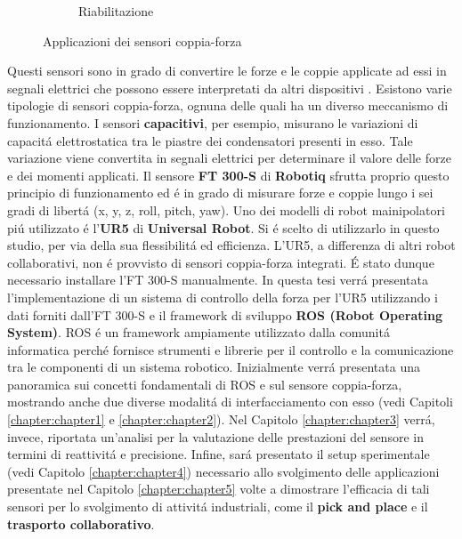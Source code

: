 \begin{figure}[H]
\begin{subfigure}[b]{0.33\textwidth}
        \caption{Riabilitazione}
        \label{fig:rehab}
    \end{subfigure}
    \caption{Applicazioni dei sensori coppia-forza}\label{fig:industrial_applications}
\end{figure}
Questi sensori sono in grado di convertire le forze e le coppie applicate ad essi in segnali elettrici che possono essere 
interpretati da altri dispositivi \cite{templeman2020multi}. 
Esistono varie tipologie di sensori coppia-forza, ognuna delle quali ha un diverso meccanismo di funzionamento. 
I sensori \textbf{capacitivi}, per esempio, misurano le variazioni di capacit\'{a} elettrostatica tra le piastre dei condensatori 
presenti in esso. Tale variazione viene convertita in segnali elettrici per determinare il valore delle forze e dei momenti 
applicati.
Il sensore \textbf{FT 300-S} di \textbf{Robotiq} sfrutta proprio questo principio di funzionamento ed \'{e} in grado di misurare 
forze e coppie lungo i sei gradi di libert\'{a} (x, y, z, roll, pitch, yaw). 
Uno dei modelli di robot mainipolatori pi\'{u} utilizzato \'{e} l'\textbf{UR5} di \textbf{Universal Robot}. Si \'{e} scelto di 
utilizzarlo in questo studio, per via della sua flessibilit\'{a} ed efficienza. 
L'UR5, a differenza di altri robot collaborativi, non \'{e} provvisto di sensori coppia-forza integrati. \'{E} stato dunque necessario 
installare l'FT 300-S manualmente. 
In questa tesi verr\'{a} presentata l'implementazione di un sistema di controllo della forza per l'UR5 utilizzando i dati
forniti dall'FT 300-S e il framework di sviluppo \textbf{ROS (Robot Operating System)}.
ROS \'{e} un framework ampiamente utilizzato dalla comunit\'{a} informatica perch\'{e} fornisce strumenti e librerie 
per il controllo e la comunicazione tra le componenti di un sistema robotico. Inizialmente verr\'{a} presentata una panoramica 
sui concetti fondamentali di ROS e sul sensore coppia-forza, mostrando anche due diverse modalit\'{a} di interfacciamento con esso 
(vedi Capitoli \ref{chapter:chapter1} e \ref{chapter:chapter2}).
Nel Capitolo \ref{chapter:chapter3} verr\'{a}, invece, riportata un'analisi per la valutazione delle prestazioni del sensore in termini di 
reattivit\'{a} e precisione. Infine, sar\'{a} presentato il setup sperimentale (vedi Capitolo \ref{chapter:chapter4}) necessario 
allo svolgimento delle applicazioni presentate nel Capitolo \ref{chapter:chapter5} volte a dimostrare l'efficacia
di tali sensori per lo svolgimento di attivit\'{a} industriali, come il \textbf{pick and place} e il \textbf{trasporto collaborativo}.

